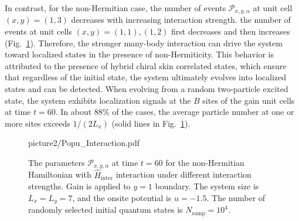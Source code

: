 \documentclass[longbibliography, aps, prx, amsmath, amssymb, amsfonts, twocolumn,superscriptaddress, footinbib]{revtex4-1}
\begin{document}
	In contrast, for the non-Hermitian case, the number of events $\mathcal{P}_{x,y,\alpha}$ at unit cell $(x,y)=(1,3)$ decreases with increasing interaction strength. the number of events at unit cells $(x,y)=(1,1),(1,2)$ first decreases and then increases (Fig.~\ref{fig:02_Supple}). 
	Therefore, the stronger many-body interaction can drive the system toward localized states in the presence of non-Hermiticity.
	This behavior is attributed to the presence of hybrid chiral skin correlated states, which ensure that regardless of the initial state, the system ultimately evolves into localized states and can be detected.
	When evolving from a random two-particle excited state, the system exhibits localization signals at the $B$ sites of the gain unit cells at time $t=60$.
	In about $88\%$ of the cases, the average particle number at one or more sites exceeds $1/(2L_x)$ (solid lines in Fig.~\ref{fig:02_Supple}).
	\begin{figure}[htbp]
		\begin{overpic}[width=0.95\linewidth]{picture2/Popu_Interaction.pdf}
		\end{overpic}
		\caption{The parameters $\mathcal{P}_{x,y,\alpha}$ at time $t=60$ for the non-Hermitian Hamiltonian with $\hat{H}_{\text{inter}}$ interaction under different interaction strengths. Gain is applied to $y=1$ boundary. The system size is $L_x=L_y=7$, and the onsite potential is $u=-1.5$. The number of randomly selected initial quantum states is $N_{\text{samp}}=10^4$.}
		\label{fig:02_Supple}
	\end{figure}


\end{document}

